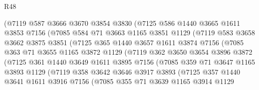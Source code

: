 \begin{lexlean}{R48}
\begin{coremodule}
              (@7119
                @587
                @3666
                @3670
                @3854
                @3830
                (@7125
                  @586
                  @1440
                  @3665
                  @1611
                  @3853
                  @7156
                  (@7085
                    @584
                    @71
                    @3663
                    @1165
                    @3851
                    @1129
                    (@7119
                      @583
                      @3658
                      @3662
                      @3875
                      @3851
                      (@7125
                        @365
                        @1440
                        @3657
                        @1611
                        @3874
                        @7156
                        (@7085
                          @363
                          @71
                          @3655
                          @1165
                          @3872
                          @1129
                          (@7119
                            @362
                            @3650
                            @3654
                            @3896
                            @3872
                            (@7125
                              @361
                              @1440
                              @3649
                              @1611
                              @3895
                              @7156
                              (@7085
                                @359
                                @71
                                @3647
                                @1165
                                @3893
                                @1129
                                (@7119
                                  @358
                                  @3642
                                  @3646
                                  @3917
                                  @3893
                                  (@7125
                                    @357
                                    @1440
                                    @3641
                                    @1611
                                    @3916
                                    @7156
                                    (@7085
                                      @355
                                      @71
                                      @3639
                                      @1165
                                      @3914
                                      @1129

\end{coremodule}
\end{lexlean}
